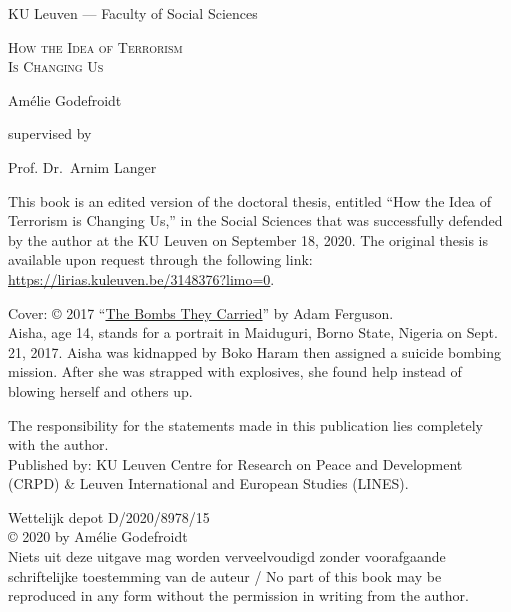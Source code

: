 \begin{titlepage}

\thispagestyle{noheader}
\begin{center}
	{\Large KU Leuven --- Faculty of Social Sciences \par}
	\vspace{5cm}
	{\huge \scshape How the Idea of Terrorism \\ Is Changing Us\par}
	\vspace{1cm}
	{\Large Amélie Godefroidt\par}
	\vfill
	supervised by\par
	Prof. Dr.~Arnim Langer
\end{center}

\newpage
\thispagestyle{noheader}
\small
\noindent This book is an edited version of the doctoral thesis, entitled ``How the Idea of Terrorism is Changing Us,'' in the Social Sciences that was successfully defended by the author at the KU Leuven on September 18, 2020. The original thesis is available upon request through the following link: \href{https://lirias.kuleuven.be/3148376?limo=0}{https://lirias.kuleuven.be/3148376?limo=0}.

\vfill

\noindent Cover: © 2017 ``\href{https://adamfergusonstudio.com/the-bombs-they-carried/f1aqte133ngoi188v72d30engmqvs8}{The Bombs They Carried}'' by Adam Ferguson.\\

\noindent Aisha, age 14, stands for a portrait in Maiduguri, Borno State, Nigeria on Sept. 21, 2017. Aisha was kidnapped by Boko Haram then assigned a suicide bombing mission. After she was strapped with explosives, she found help instead of blowing herself and others up.\\


\vfill

\noindent The responsibility for the statements made in this publication lies completely with the author.\\

\noindent Published by: KU Leuven Centre for Research on Peace and Development (CRPD) \& 
Leuven International and European Studies (LINES).

\noindent Wettelijk depot D/2020/8978/15\\

\noindent © 2020 by Amélie Godefroidt\\

\noindent Niets uit deze uitgave mag worden verveelvoudigd zonder voorafgaande schriftelijke toestemming van de auteur / No part of this book may be reproduced in any form without the permission in writing from the author.\\
\end{titlepage}
